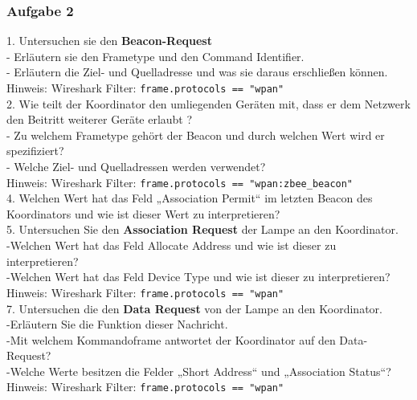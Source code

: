 \subsubsection{Aufgabe 2}
\begin{Fragen}
    1. Untersuchen sie den \textbf{Beacon-Request}\\
    - Erläutern sie den Frametype und den Command Identifier.\\ 
    - Erläutern die Ziel- und Quelladresse und was sie daraus erschließen können.\\
    Hinweis: Wireshark Filter: \verb|frame.protocols == "wpan"|\\

    2. Wie teilt der Koordinator den umliegenden Geräten mit, dass er dem Netzwerk den Beitritt weiterer Geräte erlaubt ?\\
    - Zu welchem Frametype gehört der Beacon und durch welchen Wert wird er spezifiziert?\\
    - Welche Ziel- und Quelladressen werden verwendet?\\
    Hinweis: Wireshark Filter: \verb|frame.protocols == "wpan:zbee_beacon"|\\
    
    4. Welchen Wert hat das Feld „Association Permit“ im letzten Beacon des Koordinators und wie ist dieser Wert zu interpretieren? \\
    
    5. Untersuchen Sie den \textbf{Association Request} der Lampe an den Koordinator. \\
    -Welchen Wert hat das Feld \grqq Allocate Address \grqq{} und wie ist dieser zu interpretieren?\\
    -Welchen Wert hat das Feld \grqq Device Type\grqq{} und wie ist dieser zu interpretieren?\\
    Hinweis: Wireshark Filter: \verb|frame.protocols == "wpan"|\\
    
    7. Untersuchen die den \textbf{Data Request} von der Lampe an den Koordinator.\\
    -Erläutern Sie die Funktion dieser Nachricht.\\
    -Mit welchem Kommandoframe antwortet der Koordinator auf den Data-Request?\\
    -Welche Werte besitzen die Felder „Short Address“ und „Association Status“?\\
    Hinweis: Wireshark Filter: \verb|frame.protocols == "wpan"|\\


\end{Fragen}
